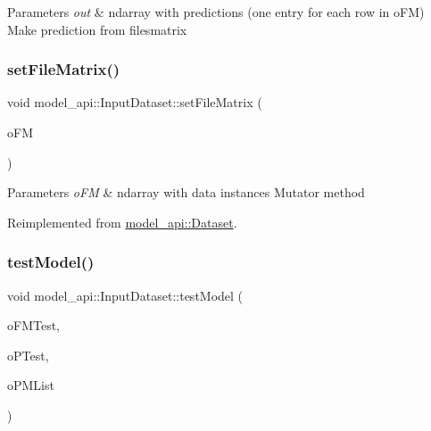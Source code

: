 \begin{DoxyParams}{Parameters}
{\em out} & ndarray with predictions (one entry for each row in o\+FM) Make prediction from filesmatrix \\
\hline
\end{DoxyParams}
\mbox{\label{classmodel__api_1_1InputDataset_a71111535a17422db1f0fdbe2ac6ce1c8}} 
\subsubsection{\texorpdfstring{set\+File\+Matrix()}{setFileMatrix()}}
{\footnotesize\ttfamily void model\+\_\+api\+::\+Input\+Dataset\+::set\+File\+Matrix (\begin{DoxyParamCaption}\item[{nda \&}]{o\+FM }\end{DoxyParamCaption})\hspace{0.3cm}{\ttfamily [virtual]}}


\begin{DoxyParams}{Parameters}
{\em o\+FM} & ndarray with data instances Mutator method \\
\hline
\end{DoxyParams}


Reimplemented from \hyperlink{classmodel__api_1_1Dataset_a50e8c50a3b45cb39cf4403ebfdc1c2dc}{model\+\_\+api\+::\+Dataset}.

\mbox{\label{classmodel__api_1_1InputDataset_a0829ebb09eca7632e7032f40d451c70d}} 
\subsubsection{\texorpdfstring{test\+Model()}{testModel()}}
{\footnotesize\ttfamily void model\+\_\+api\+::\+Input\+Dataset\+::test\+Model (\begin{DoxyParamCaption}\item[{const nda \&}]{o\+F\+M\+Test,  }\item[{const nda \&}]{o\+P\+Test,  }\item[{std\+::vector$<$ \hyperlink{structPerformaceMetric}{Performace\+Metric} $>$ \&}]{o\+P\+M\+List }\end{DoxyParamCaption})}




